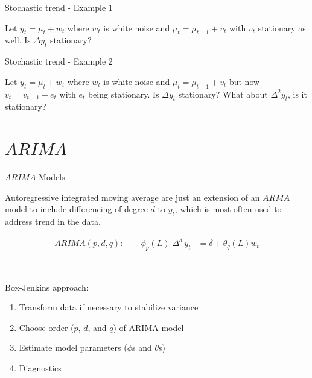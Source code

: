 \documentclass[11pt,ignorenonframetext,]{beamer}
\begin{document}
\begin{frame}[t]{Stochastic trend - Example 1}

Let \(y_t = \mu_t + w_t\) where \(w_t\) is white noise and
\(\mu_t = \mu_{t-1} + v_t\) with \(v_t\) stationary as well. Is
\(\Delta y_t\) stationary?

\end{frame}

\begin{frame}[t]{Stochastic trend - Example 2}

Let \(y_t = \mu_t + w_t\) where \(w_t\) is white noise and
\(\mu_t = \mu_{t-1} + v_t\) but now \(v_t = v_{t-1} + e_t\) with \(e_t\)
being stationary. Is \(\Delta y_t\) stationary? What about
\(\Delta^2 y_t\), is it stationary?

\end{frame}

\section{\texorpdfstring{\(ARIMA\)}{ARIMA}}\label{arima}

\begin{frame}{\(ARIMA\) Models}

Autoregressive integrated moving average are just an extension of an
\(ARMA\) model to include differencing of degree \(d\) to \(y_t\), which
is most often used to address trend in the data.

\[
\begin{aligned}
ARIMA(p,d,q): \qquad \phi_p(L) \; \Delta^d \, y_t &= \delta + \theta_q(L) w_t  
\end{aligned}
\]

\pause

\(~\)

Box-Jenkins approach:

\begin{enumerate}
\def\labelenumi{\arabic{enumi}.}
\item
  Transform data if necessary to stabilize variance
\item
  Choose order (\(p\), \(d\), and \(q\)) of ARIMA model
\item
  Estimate model parameters (\(\phi\)s and \(\theta\)s)
\item
  Diagnostics
\end{enumerate}

\end{frame}
\end{document}
